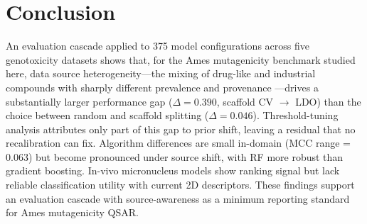 \section{Conclusion}

An evaluation cascade applied to 375 model configurations across five genotoxicity datasets shows that, 
for the Ames mutagenicity benchmark studied here, data source heterogeneity---the mixing of drug-like and industrial compounds with sharply different prevalence and provenance
---drives a substantially larger performance gap ($\Delta = 0.390$, scaffold CV $\to$ LDO) than the choice between random and scaffold splitting ($\Delta = 0.046$). 
Threshold-tuning analysis attributes only part of this gap to prior shift, leaving a residual that no recalibration can fix. Algorithm differences are small in-domain (MCC range = 0.063) 
but become pronounced under source shift, with RF more robust than gradient boosting. 
In-vivo micronucleus models show ranking signal but lack reliable classification utility with current 2D descriptors. 
These findings support an evaluation cascade with source-awareness as a minimum reporting standard for Ames mutagenicity QSAR.
